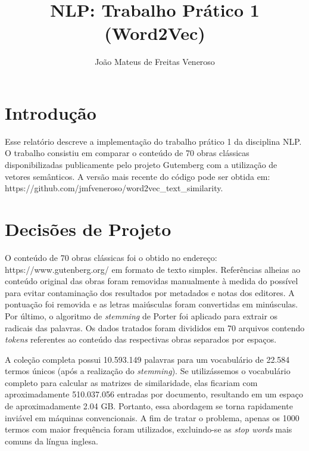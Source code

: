 \documentclass{article}
\begin{document}
\title{NLP: Trabalho Prático 1 (Word2Vec)}
\author{João Mateus de Freitas Veneroso}

\maketitle

\section{Introdução}

Esse relatório descreve a implementação do trabalho prático 1 da disciplina NLP. 
O trabalho consistiu em comparar o conteúdo de 70 obras clássicas
disponibilizadas publicamente pelo projeto Gutemberg com a utilização de
vetores semânticos. A versão mais recente do código pode ser obtida em: \\
https://github.com/jmfveneroso/word2vec\_text\_similarity.

\section{Decisões de Projeto}

O conteúdo de 70 obras clássicas foi o obtido no endereço: \\
https://www.gutenberg.org/ em formato de texto simples. Referências alheias ao conteúdo original das obras foram removidas 
manualmente à medida do possível para evitar contaminação dos resultados por metadados e notas
dos editores. A pontuação foi removida e as letras maiúsculas foram convertidas em minúsculas.
Por último, o algoritmo de \textit{stemming} de Porter foi aplicado para extrair os radicais das
palavras. Os dados tratados foram divididos em 70 arquivos contendo \textit{tokens} referentes 
ao conteúdo das respectivas obras separados por espaços.

A coleção completa possui 10.593.149 palavras para um vocabulário de 22.584 termos únicos (após 
a realização do \textit{stemming}). Se utilizássemos o vocabulário completo para calcular as matrizes de similaridade,
elas ficariam com aproximadamente 510.037.056 entradas por documento, resultando em um espaço de aproximadamente 2.04 GB.
Portanto, essa abordagem se torna rapidamente inviável em máquinas convencionais. A fim de tratar o problema, apenas
os 1000 termos com maior frequência foram utilizados, excluindo-se as \textit{stop words} mais comuns da
língua inglesa. 
\end{document}
